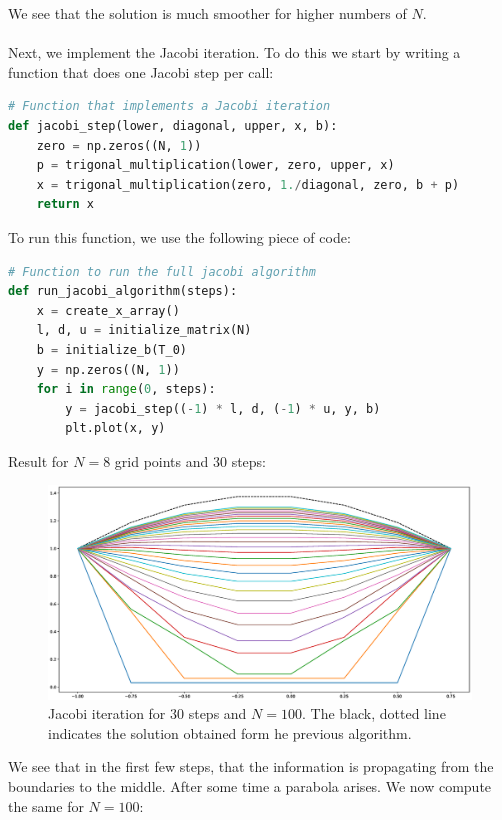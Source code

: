 \documentclass{scrartcl}
\begin{document}
We see that the solution is much smoother for higher numbers of \( N \). \\\\Next, we implement the Jacobi iteration.
To do this we start by writing a function that does one Jacobi step per call:
\begin{lstlisting}[title=Function that performs one Jacobi step.,  language=Python, frame=single]
# Function that implements a Jacobi iteration
def jacobi_step(lower, diagonal, upper, x, b):
	zero = np.zeros((N, 1))
	p = trigonal_multiplication(lower, zero, upper, x)
	x = trigonal_multiplication(zero, 1./diagonal, zero, b + p)
	return x
\end{lstlisting}
To run this function, we use the following piece of code:
\begin{lstlisting}[title=Function to perform several Jacobi steps and plots the result for each step.,  language=Python, frame=single]
# Function to run the full jacobi algorithm
def run_jacobi_algorithm(steps):
	x = create_x_array()
	l, d, u = initialize_matrix(N)
	b = initialize_b(T_0)
	y = np.zeros((N, 1))
	for i in range(0, steps):
		y = jacobi_step((-1) * l, d, (-1) * u, y, b)
		plt.plot(x, y)
\end{lstlisting}
Result for \( N=8 \) grid points and \(30\) steps:
\begin{figure}[H]
	\centering
	\includegraphics[width=1.1\linewidth]{Plots/Jacobi_Comparison.eps}
	\caption{Jacobi iteration for \(30\) steps and \( N=100 \). The black, dotted line indicates the solution obtained form he previous algorithm.}
	\label{fig:Jacobi_Comparison}
\end{figure}
We see that in the first few steps, that the information is propagating from the boundaries to the middle. After some time a parabola arises.
We now compute the same for \( N=100 \):
\end{document}
